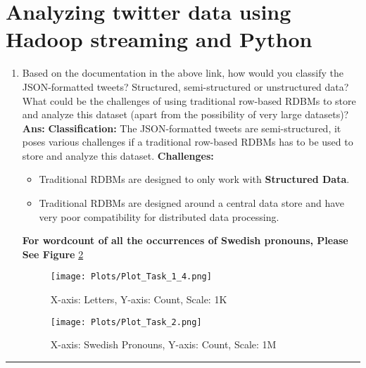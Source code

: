 \documentclass[12pt]{article}
\begin{document}
\section{Analyzing twitter data using Hadoop streaming and Python}
\begin{enumerate}
\item  Based on the documentation in the above link, how would you classify the JSON-formatted tweets? Structured, semi-structured or unstructured data? What could be the challenges of using traditional row-based RDBMs to store and analyze this dataset (apart from the possibility of very large datasets)?
\newline
\newline
\textbf{Ans:}
	\newline
    \newline
    	\textbf{Classification:}
        \newline
        \newline
        	The JSON-formatted tweets are semi-structured, it poses various challenges if a traditional row-based RDBMs has to be used to store and analyze this dataset.\cite{SSD}
    \newline
    \newline
    	\textbf{Challenges:}
        \newline
        \newline
        	\begin{itemize}
        	\item Traditional RDBMs are designed to only work with \textbf{Structured Data}.
            \item Traditional RDBMs are designed around a central data store and have very poor compatibility for distributed data processing.
        	\end{itemize}
    \textbf{For wordcount of all the occurrences of Swedish pronouns, Please See Figure} \ref{fig:WordCount of pronouns}
\begin{figure}
    \texttt{[image: Plots/Plot\_Task\_1\_4.png]}
    \caption{X-axis: Letters, Y-axis: Count, Scale: 1K}
    \label{fig:WordCount of letters}
	\end{figure}
\begin{figure}
    \texttt{[image: Plots/Plot\_Task\_2.png]}
    \caption{X-axis: Swedish Pronouns, Y-axis: Count, Scale: 1M}
    \label{fig:WordCount of pronouns}
	\end{figure}
\end{enumerate}
\hrule
\newpage


\end{document}
